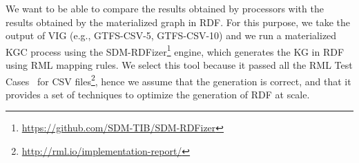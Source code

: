 We want to be able to compare the results obtained by processors with the results obtained by the materialized graph in RDF. For this purpose, we take the output of VIG (e.g., GTFS-CSV-5, GTFS-CSV-10) and we run a materialized KGC process using the SDM-RDFizer\footnote{\url{https://github.com/SDM-TIB/SDM-RDFizer}} engine, which generates the KG in RDF using RML mapping rules. We select this tool because it passed all the RML Test Cases~\citep{heyvaert2019conformance} for CSV files\footnote{\url{http://rml.io/implementation-report/}}, hence we assume that the generation is correct, and that it provides a set of techniques to optimize the generation of RDF at scale. 

\begin{table}[]
\centering
\caption[Mapping features of GTFS]{\textbf{Mapping features of GTFS.} Each TriplesMap of the GTFS mapping file and its corresponding features: the related source, number of Classes, PredicateObjectMaps, Predicates, Objects and RefObjectMaps (joins). }
\label{tab:mappings}
\end{table}
